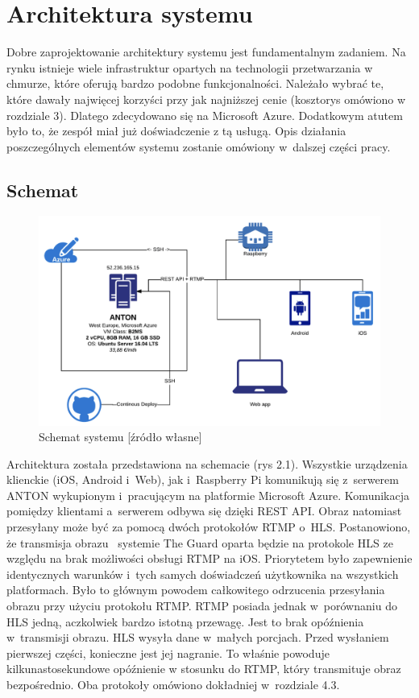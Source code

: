 \chapter{Architektura systemu}

Dobre zaprojektowanie architektury systemu jest fundamentalnym zadaniem. Na rynku istnieje wiele infrastruktur opartych na technologii przetwarzania w chmurze, które oferują bardzo podobne funkcjonalności. Należało wybrać te, które dawały najwięcej korzyści przy jak najniższej cenie (kosztorys omówiono w rozdziale 3). Dlatego zdecydowano się na Microsoft Azure. Dodatkowym atutem było to, że zespół miał już doświadczenie z tą usługą. Opis działania poszczególnych elementów systemu zostanie omówiony w~dalszej części pracy.

\section{Schemat}

\begin{figure}[ht] %
   \centering
   \includegraphics[width=12cm]{anton.png} 
   \caption{Schemat systemu [źródło własne]}
\end{figure}

Architektura została przedstawiona na schemacie (rys 2.1). Wszystkie urządzenia klienckie (iOS, Android i~Web), jak i~Raspberry Pi komunikują się z~serwerem ANTON wykupionym i~pracującym na platformie Microsoft Azure. Komunikacja pomiędzy klientami a~serwerem odbywa się dzięki REST API. Obraz natomiast przesyłany może być za pomocą dwóch protokołów RTMP o~HLS. Postanowiono, że transmisja obrazu ~systemie The Guard oparta będzie na protokole HLS ze względu na brak możliwości obsługi RTMP na iOS. Priorytetem było zapewnienie identycznych warunków i~tych samych doświadczeń użytkownika na wszystkich platformach. Było to głównym powodem całkowitego odrzucenia przesyłania obrazu przy użyciu protokołu RTMP. RTMP posiada jednak w~porównaniu do HLS jedną, aczkolwiek bardzo istotną przewagę. Jest to brak opóźnienia w~transmisji obrazu. HLS wysyła dane w~małych porcjach. Przed wysłaniem pierwszej części, konieczne jest jej nagranie. To właśnie powoduje kilkunastosekundowe opóźnienie w stosunku do RTMP, który transmituje obraz bezpośrednio. Oba protokoły omówiono dokładniej w~rozdziale 4.3.


